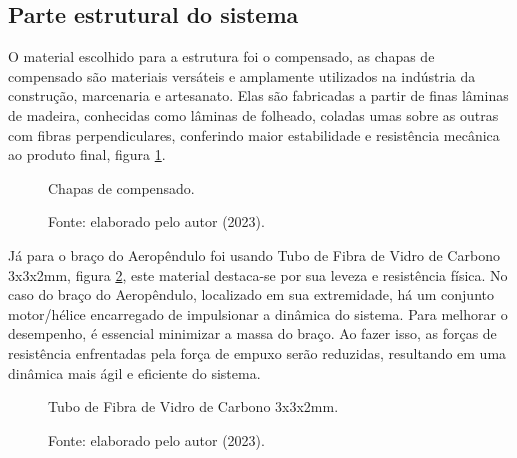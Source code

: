 \subsection{ Parte estrutural do sistema}

 O material escolhido para a estrutura foi o compensado, as chapas de compensado são materiais versáteis e amplamente utilizados na indústria da construção, marcenaria e artesanato. Elas são fabricadas a partir de finas lâminas de madeira, conhecidas como lâminas de folheado, coladas umas sobre as outras com fibras perpendiculares, conferindo maior estabilidade e resistência mecânica ao produto final, figura \ref{fig3:image_02}.


\begin{figure}[!h]
	\centering
	\caption{Chapas de compensado.}
	\caption*{Fonte: elaborado pelo autor (2023).}
	\label{fig3:image_02}
\end{figure}

\newpage
 Já para o braço do Aeropêndulo foi usando Tubo de Fibra de Vidro de Carbono 3x3x2mm, figura \ref{fig3:image_03}, este material destaca-se por sua leveza e resistência física. No caso do braço do Aeropêndulo, localizado em sua extremidade, há um conjunto motor/hélice encarregado de impulsionar a dinâmica do sistema. Para melhorar o desempenho, é essencial minimizar a massa do braço. Ao fazer isso, as forças de resistência enfrentadas pela força de empuxo serão reduzidas, resultando em uma dinâmica mais ágil e eficiente do sistema.

\begin{figure}[!h]
	\centering
	\caption{Tubo de Fibra de Vidro de Carbono 3x3x2mm.}
	\caption*{Fonte: elaborado pelo autor (2023).}
	\label{fig3:image_03}
\end{figure}


